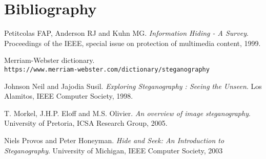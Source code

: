 \documentclass[notitlepage]{report}
\begin{document}
\chapter{Bibliography}
\begin{thebibliography}{9}
Petitcolas FAP, Anderson RJ and Kuhn MG.
\textit{Information Hiding - A Survey}.
Proceedings of the IEEE, special issue on protection of multimedia content, 1999.

Merriam-Webster dictionary.
\\\texttt{https://www.merriam-webster.com/dictionary/steganography}

Johnson Neil and Jajodia Susil.
\textit{Exploring Steganography : Seeing the Unseen}. 
Los Alamitos, IEEE Computer Society, 1998.

%
T. Morkel, J.H.P. Eloff and M.S. Olivier. 
\textit{An overview of image steganography}.
University of Pretoria, ICSA Research Group, 2005.

Niels Provos and Peter Honeyman.
\textit{Hide and Seek: An Introduction to Steganography}.
University of Michigan, IEEE Computer Society, 2003

\end{thebibliography}
\end{document}
